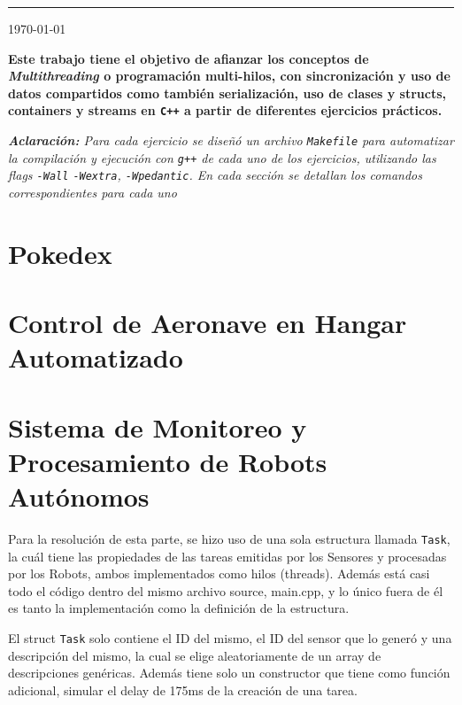 \documentclass[11pt, a4paper]{article}
\begin{document}
{\noindent\rule{\textwidth}{0.5pt}}

\vspace{0.1cm}
\begin{center}
    {\large \today}
\end{center}
\vspace{0.1cm}

\begin{multicols}{2}

{\bfseries\selectfont Este trabajo tiene el objetivo de afianzar los conceptos de
\textit{Multithreading} o programación multi-hilos, con sincronización y uso de datos
compartidos como también serialización, uso de clases y structs, containers y streams
en \lstinline|C++| a partir de diferentes ejercicios prácticos.
}
\begin{center}
    {\small\itshape\textbf{Aclaración:} Para cada ejercicio se diseñó un archivo \lstinline|Makefile|
    para automatizar la compilación y ejecución con \lstinline|g++| de cada uno de los ejercicios, 
    utilizando las flags \lstinline|-Wall| \lstinline|-Wextra|, \lstinline|-Wpedantic|. En cada sección se detallan
    los comandos correspondientes para cada uno} 
\end{center}

\section{Pokedex}


\section{Control de Aeronave en Hangar Automatizado}


\section{Sistema de Monitoreo y Procesamiento de Robots Autónomos}

Para la resolución de esta parte, se hizo uso de una sola estructura
llamada \lstinline|Task|, la cuál tiene las propiedades de las tareas
emitidas por los Sensores y procesadas por los Robots, ambos
implementados como hilos (threads). Además está casi todo el código
dentro del mismo archivo source, main.cpp, y lo único fuera de él es tanto
la implementación como la definición de la estructura.

El struct \lstinline|Task| solo contiene el ID del mismo, el ID del
sensor que lo generó y una descripción del mismo, la cual se elige aleatoriamente
de un array de descripciones genéricas. Además tiene solo un constructor que tiene
como función adicional, simular el delay de 175ms de la creación de una tarea.


\end{multicols}
\end{document}
